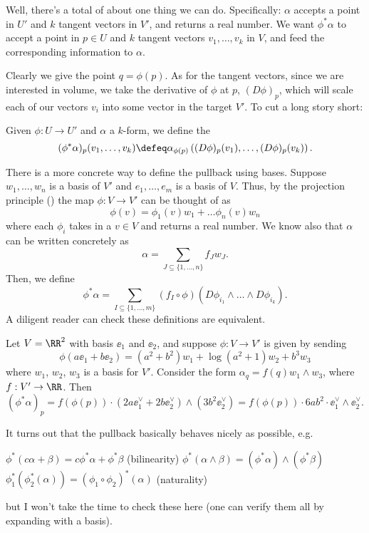 Well, there's a total of about one thing we can do.
Specifically: $\alpha$ accepts a point in $U'$ and $k$ tangent vectors in $V'$,
and returns a real number.
We want $\phi^\ast \alpha$ to accept a point in $p \in U$
and $k$ tangent vectors $v_1, \dots, v_k$ in $V$,
and feed the corresponding information to $\alpha$.

Clearly we give the point $q = \phi(p)$.
As for the tangent vectors, since we are interested in volume, we take the
derivative of $\phi$ at $p$, $(D\phi)_p$, which will scale each of our vectors $v_i$
into some vector in the target $V'$.
To cut a long story short:
\begin{definition}
	Given $\phi : U \to U'$ and $\alpha$ a $k$-form, we define the 
	\[
		(\phi^\ast \alpha)_p(v_1, \dots, v_k)
		\defeq \alpha_{\phi(p)}
		\left( (D\phi)_p(v_1), \dots, (D\phi)_p(v_k) \right).
	\]
\end{definition}

There is a more concrete way to define the pullback using bases.
Suppose $w_1, \dots, w_n$ is a basis of $V'$
and $e_1, \dots, e_m$ is a basis of $V$.
Thus, by the projection principle () 
the map $\phi : V \to V'$ can be thought of as
\[ \phi(v) = \phi_1(v) w_1 +  \dots \phi_n(v) w_n \]
where each $\phi_i$ takes in a $v \in V$ and returns a real number.
We know also that $\alpha$ can be written concretely as
\[ \alpha = \sum_{J \subseteq \{1, \dots, n\}} f_J w_J. \]
Then, we define
\[
	\phi^\ast\alpha
	= \sum_{I \subseteq \{1, \dots, m\}}
	(f_I \circ \phi) (D\phi_{i_1} \wedge \dots \wedge D\phi_{i_k}).
\]
A diligent reader can check these definitions are equivalent.
\begin{example}
	Let $V = \RR^2$ with basis $\ee_1$ and $\ee_2$,
	and suppose $\phi : V \to V'$ is given by sending
	\[ \phi(a\ee_1 + b\ee_2) = (a^2+b^2)w_1 + \log(a^2+1) w_2 + b^3 w_3 \]
	where $w_1$, $w_2$, $w_3$ is a basis for $V'$.
	Consider the form $\alpha_q = f(q) w_1 \wedge w_3$, where $f : V' \to \RR$.
	Then
	\[ (\phi^\ast\alpha)_p = f(\phi(p)) \cdot (2a \ee_1^\vee + 2b\ee_2^\vee) \wedge (3b^2 \ee_2^\vee)
		= f(\phi(p)) \cdot 6ab^2 \cdot \ee_1^\vee \wedge \ee_2^\vee. \]
\end{example}

It turns out that the pullback basically behaves nicely as possible, e.g.\
\begin{itemize}
	\ii $\phi^\ast(c\alpha + \beta) = c\phi^\ast \alpha + \phi^\ast\beta$ (bilinearity)
	\ii $\phi^\ast(\alpha\wedge\beta)
	= (\phi^\ast \alpha)\wedge(\phi^\ast \beta)$
	\ii $\phi_1^\ast(\phi_2^\ast(\alpha)) 
	= (\phi_1 \circ \phi_2)^\ast(\alpha)$ (naturality)
\end{itemize}
but I won't take the time to check these here
(one can verify them all by expanding with a basis).
	
